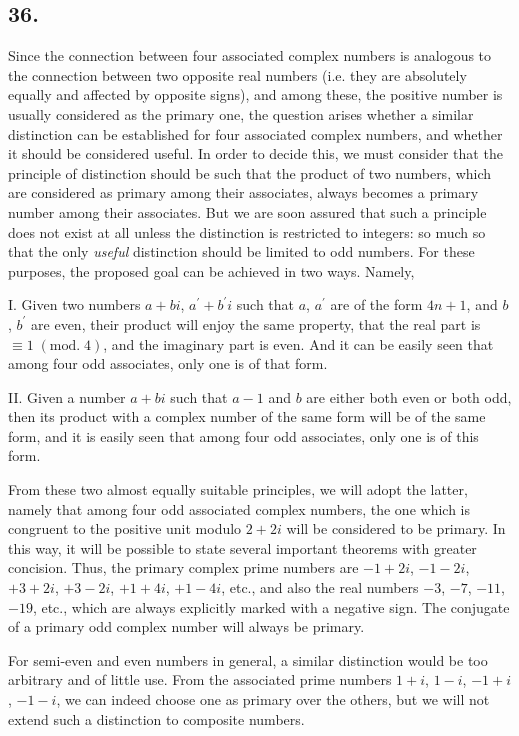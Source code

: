 \documentclass[twoside,12pt]{memoir}
\renewcommand{\pmod}[1]{\;(\textrm{mod.}\;#1)}
\begin{document}
\subsection*{36.}
 
Since the connection between four associated complex numbers is analogous to the connection between two opposite real numbers (i{.}e{.} they are absolutely equally and affected by opposite signs), and among these, the positive number is usually considered as the primary one, \pagebreak%
the question arises whether a similar distinction can be established for four associated complex numbers, and whether it should be considered useful. In order to decide this, we must consider that the principle of distinction should be such that the product of two numbers, which are considered as primary among their associates, always becomes a primary number among their associates. But we are soon assured that such a principle does not exist at all unless the distinction is restricted to integers: so much so that the only \textit{useful} distinction should be limited to odd numbers. For these purposes, the proposed goal can be achieved in two ways. Namely,
 
I. Given two numbers \(a+b i\), \(a^{\prime}+b^{\prime} i\) such that \(a\), \(a^{\prime}\) are of the form \(4 n+1\), and \(b\), \(b^{\prime}\) are even, their product will enjoy the same property, that the real part is \(\equiv 1\pmod{4}\), and the imaginary part is even. And it can be easily seen that among four odd associates, only one is of that form.
 
II. Given a number \(a+b i\) such that \(a-1\) and \(b\) are either both even or both odd, then its product with a complex number of the same form will be of the same form, and it is easily seen that among four odd associates, only one is of this form.

From these two almost equally suitable principles, we will adopt the latter, namely that among four odd associated complex numbers, the one which is congruent to the positive unit modulo \(2+2i\) will be considered to be primary. In this way, it will be possible to state several important theorems with greater concision. Thus, the primary complex prime numbers are \(-1+2i\), \(-1-2i\), \(+3+2i\), \(+3-2i\), \(+1+4i\), \(+1-4i\), etc., and also the real numbers \(-3\), \(-7\), \(-11\), \(-19\), etc., which are always explicitly marked with a negative sign. The conjugate of a primary odd complex number will always be primary.

For semi-even and even numbers in general, a similar distinction would be too arbitrary and of little use. From the associated prime numbers \(1+i\), \(1-i\), \(-1+i\), \(-1-i\), we can indeed choose one as primary over the others, but we will not extend such a distinction to composite numbers.
\end{document}
